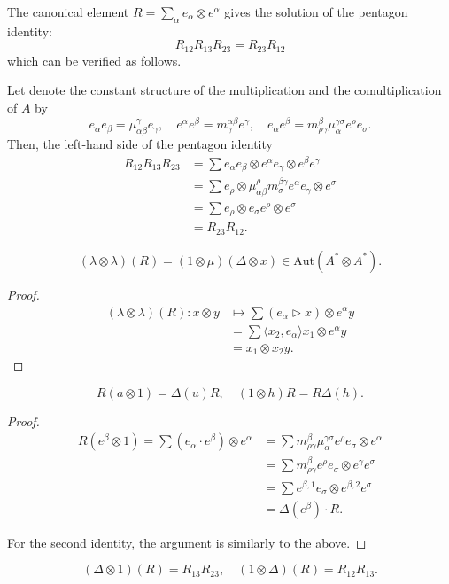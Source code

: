 \documentclass[11pt]{amsart}
\begin{document}
The canonical element $R = \sum_\alpha e_\alpha \otimes e^\alpha$ gives the solution of the pentagon identity:
\[
    R_{12} R_{13} R_{23} = R_{23} R_{12}
\]
which can be verified as follows.

Let denote the constant structure of the multiplication and the comultiplication of $A$ by
\[
    e_\alpha e_\beta = \mu_{\alpha \beta}^\gamma e_\gamma, \quad e^\alpha e^\beta = m^{\alpha \beta}_\gamma e^\gamma, \quad e_\alpha e^\beta = m^\beta_{\rho \gamma} \mu_\alpha^{\gamma \sigma} e^\rho e_\sigma.
\]
Then, the left-hand side of the pentagon identity 
\begin{align*}
    R_{12} R_{13} R_{23} & = \sum e_\alpha e_\beta \otimes e^\alpha e_\gamma \otimes e^\beta e^\gamma \\
    & = \sum e_\rho \otimes \mu_{\alpha \beta}^\rho m^{\beta \gamma}_\sigma e^\alpha e_\gamma \otimes e^\sigma \\
    & = \sum e_\rho \otimes e_\sigma e^\rho \otimes e^\sigma \\
    & = R_{23} R_{12}.
\end{align*}


\begin{proposition}
    \[
    (\lambda \otimes \lambda)(R) = (1 \otimes \mu) (\Delta \otimes x) \in \mathrm{Aut}(A^* \otimes A^*).
    \]
\end{proposition}
\begin{proof}
    \begin{align*}
    (\lambda \otimes \lambda) (R) : x \otimes y & \mapsto \sum (e_\alpha \triangleright x) \otimes e^\alpha y \\
    & = \sum \langle x_2, e_\alpha \rangle x_1 \otimes e^\alpha y \\
    & = x_1 \otimes x_2 y.
    \end{align*}
\end{proof}

\begin{proposition}
    \[
    R (a \otimes 1) = \Delta(u)R, \quad (1 \otimes h)R = R \Delta(h).
    \]
\end{proposition}
\begin{proof}
    \begin{align*}
        R(e^\beta \otimes 1) = \sum (e_\alpha \cdot e^\beta) \otimes e^\alpha & = \sum m^\beta_{\rho \gamma} \mu_\alpha^{\gamma \sigma} e^\rho e_\sigma \otimes e^\alpha \\
        & = \sum m^\beta_{\rho \gamma} e^\rho e_\sigma \otimes e^\gamma e^\sigma \\
        & = \sum e^{\beta,1} e_\sigma \otimes e^{\beta, 2} e^\sigma \\
        & = \Delta(e^\beta) \cdot R.
    \end{align*}
    
    For the second identity, the argument is similarly to the above.
\end{proof}

\begin{proposition}
    \[
    (\Delta \otimes 1)(R) = R_{13} R_{23}, \quad (1 \otimes \Delta)(R) = R_{12} R_{13}.
    \]
\end{proposition}



\end{document}
